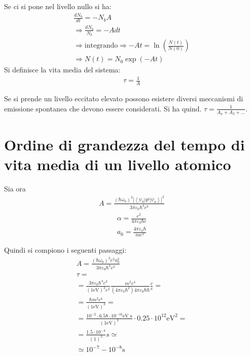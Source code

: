 Se ci si pone nel livello nullo si ha:
\begin{equation}\begin{split}
\frac{dN_b}{dt}=-N_bA \\
\Longrightarrow \frac{dN_b}{N_b}=-Adt\\
\Longrightarrow \textrm{integrando} \Longrightarrow -At=\ln{\left(\frac{N\left(t\right)}{N\left(0\right)}\right)}\\
\Longrightarrow N\left(t\right)=N_0\exp{\left(-At\right)}
\end{split}\end{equation}
Si definisce la vita media del sistema:
\begin{equation}\begin{split}
\tau =\frac{1}{A}
\end{split}\end{equation}

Se si prende un livello eccitato elevato possono esistere diversi meccanismi di emissione spontanea che devono essere considerati. Si ha quind. $\tau=\frac{1}{A_a+A_2+\dots}$.

\section[Vita media di un livello atomico]{Ordine di grandezza del tempo di vita media di un livello atomico} %
Sia ora
\begin{equation}\begin{split}
A=\frac{\left(\hbar \omega _0\right)^3\left|\left\langle \psi _b\left|q\bar r\right|\psi _a \right\rangle\right|^2}{3\pi \varepsilon_0\hbar ^4c^3}
\end{split}\end{equation}
\begin{equation}\begin{split}
\alpha=\frac{e^2}{4\pi\varepsilon_0\hbar c}\\
a_0=\frac{4\pi\varepsilon_0\hbar }{me^2}
\end{split}\end{equation}

Quindi si compiono i seguenti passaggi:
\begin{equation}\begin{split}
A=\frac{\left(\hbar \omega _0\right)^3e^2a_0^2}{3\pi \varepsilon_0\hbar ^4c^3}\\
\tau=\\
=\frac{3\pi\varepsilon_0\hbar ^4c^3}{\left(1\textrm{eV}\right)^3e^2}\frac{m^2e^4}{\left(4\pi\varepsilon_0\hbar ^2\right)4\pi\varepsilon_0\hbar \hbar }\frac{c}{c}=\\
=\frac{\hbar m^2c^4}{\left(1\textrm{eV}\right)^3}=\\
=\frac{10^{-2}\cdot 6.58\cdot 10^{-16}\textrm{eV s}}{\left(1\textrm{eV}\right)^3}\cdot 0.25\cdot 10^{12}\textrm{eV}^2=\\
=\frac{1.5\cdot 10^{-4}}{\left(1\right)^3}s\simeq\\
\simeq 10^{-7}-10^{-8} \textrm{s}
\end{split}\end{equation}

